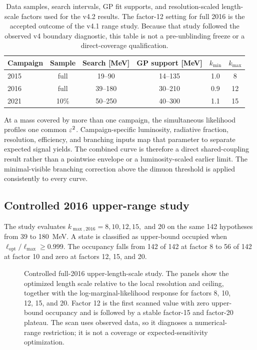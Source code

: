 \begin{table}[H]
\centering
\small
{\setlength{\tabcolsep}{5pt}
\begin{tabular}{lccccc}
\toprule
Campaign & Sample & Search [MeV] & GP support [MeV] &
$k_{\min}$ & $k_{\max}$ \\
\midrule
2015 & full & 19--90  & 14--135 & 1.0 & 8 \\
2016 & full & 39--180 & 30--210 & 0.9 & 12 \\
2021 & 10\% & 50--250 & 40--300 & 1.1 & 15 \\
\bottomrule
\end{tabular}
}
\caption{Data samples, search intervals, GP fit supports, and
resolution-scaled length-scale factors used for the v4.2 results. The factor-12
setting for full 2016 is the accepted outcome of the v4.1 range study. Because
that study followed the observed v4 boundary diagnostic, this table is not a
pre-unblinding freeze or a direct-coverage qualification.}
\label{tab:results-v4p2-configuration}
\end{table}

At a mass covered by more than one campaign, the simultaneous likelihood profiles
one common $\varepsilon^2$. Campaign-specific luminosity, radiative fraction, resolution,
efficiency, and branching inputs map that parameter to separate expected signal
yields. The combined curve is therefore a direct shared-coupling result rather
than a pointwise envelope or a luminosity-scaled earlier limit. The
minimal-visible branching correction above the dimuon threshold is applied
consistently to every curve.

\subsection{Controlled 2016 upper-range study}
\label{sec:results-v4p1-lsupper-study}
\label{sec:results-v4-support-audit}

The study evaluates $k_{\max,2016}=8,10,12,15,$ and 20 on the same 142 hypotheses
from 39 to 180~MeV. A state is classified as upper-bound occupied when
$\ell_{\mathrm{opt}}/\ell_{\max}\geq0.999$. The occupancy falls from 142 of 142 at
factor 8 to 56 of 142 at factor 10 and zero at factors 12, 15, and 20.

\begin{figure}[H]
\centering
{}
\caption{Controlled full-2016 upper-length-scale study. The panels show the
optimized length scale relative to the local resolution and ceiling, together with
the log-marginal-likelihood response for factors 8, 10, 12, 15, and 20. Factor 12
is the first scanned value with zero upper-bound occupancy and is followed by a
stable factor-15 and factor-20 plateau. The scan uses observed data, so it
diagnoses a numerical-range restriction; it is not a coverage or
expected-sensitivity optimization.}
\label{fig:results-v4p1-lsupper-study}
\end{figure}

